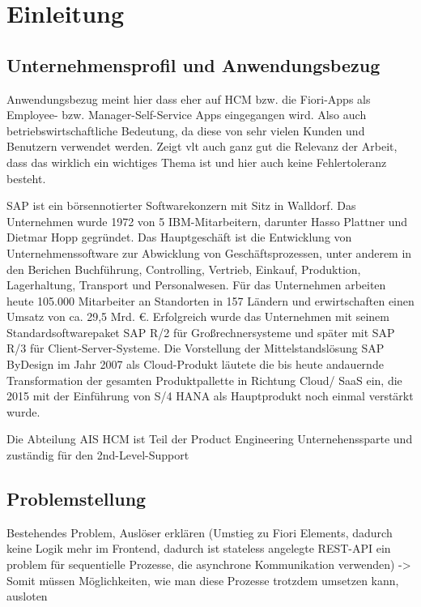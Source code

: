\chapter{Einleitung}

\section{Unternehmensprofil und Anwendungsbezug}

Anwendungsbezug meint hier dass eher auf HCM bzw. die Fiori-Apps als Employee- bzw. Manager-Self-Service Apps eingegangen wird. Also auch betriebswirtschaftliche Bedeutung, da diese von sehr vielen Kunden und Benutzern verwendet werden.
Zeigt vlt auch ganz gut die Relevanz der Arbeit, dass das wirklich ein wichtiges Thema ist und hier auch keine Fehlertoleranz besteht.

SAP ist ein börsennotierter Softwarekonzern mit Sitz in Walldorf. Das Unternehmen wurde 1972 von 5 IBM-Mitarbeitern, darunter Hasso Plattner und Dietmar Hopp gegründet. Das Hauptgeschäft ist die Entwicklung von Unternehmenssoftware zur Abwicklung von Geschäftsprozessen, unter anderem in den Berichen Buchführung, Controlling, Vertrieb, Einkauf, Produktion, Lagerhaltung, Transport und Personalwesen. Für das Unternehmen arbeiten heute 105.000 Mitarbeiter an Standorten in 157 Ländern und erwirtschaften einen Umsatz von ca. 29,5 Mrd. \euro{}. Erfolgreich wurde das Unternehmen mit seinem Standardsoftwarepaket SAP R/2 für Gro{\ss}rechnersysteme und später mit SAP R/3 für Client-Server-Systeme. Die Vorstellung der Mittelstandslösung SAP ByDesign im Jahr 2007 als Cloud-Produkt läutete die bis heute andauernde Transformation der gesamten Produktpallette in Richtung Cloud/ SaaS ein, die 2015 mit der Einführung von S/4 HANA als Hauptprodukt noch einmal verstärkt wurde.

Die Abteilung AIS HCM ist Teil der Product Engineering Unternehenssparte und zuständig für den 2nd-Level-Support

\section{Problemstellung}

Bestehendes Problem, Auslöser erklären (Umstieg zu Fiori Elements, dadurch keine Logik mehr im Frontend, dadurch ist stateless angelegte REST-API ein problem für sequentielle Prozesse, die asynchrone Kommunikation verwenden)
-> Somit müssen Möglichkeiten, wie man diese Prozesse trotzdem umsetzen kann, ausloten

